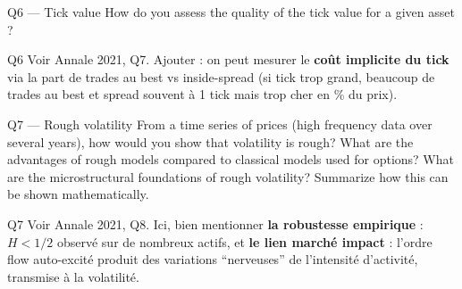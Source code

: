 \begin{questionbox}{Q6 --- Tick value}
How do you assess the quality of the tick value for a given asset ?
\end{questionbox}

\begin{solutionbox}{Q6}
Voir Annale 2021, Q7. Ajouter : on peut mesurer le \textbf{coût implicite du tick} via la part de trades au best vs inside-spread (si tick trop grand, beaucoup de trades au best et spread souvent à 1 tick mais trop cher en \% du prix).
\end{solutionbox}

\begin{questionbox}{Q7 --- Rough volatility}
From a time series of prices (high frequency data over several years), how would you show that volatility is rough? What are the advantages of rough models compared to classical models used for options? What are the microstructural foundations of rough volatility? Summarize how this can be shown mathematically.
\end{questionbox}

\begin{solutionbox}{Q7}
Voir Annale 2021, Q8. Ici, bien mentionner \textbf{la robustesse empirique} : $H<1/2$ observé sur de nombreux actifs, et \textbf{le lien marché impact} : l'ordre flow auto-excité produit des variations ``nerveuses'' de l'intensité d'activité, transmise à la volatilité.
\end{solutionbox}

